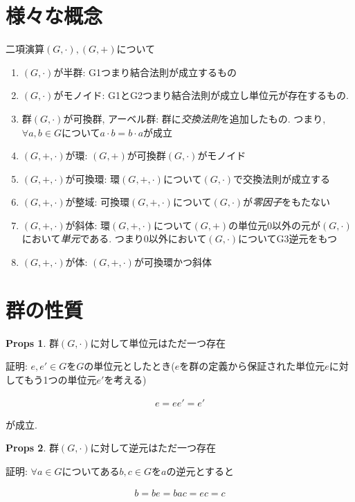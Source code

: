 \documentclass[dvipdfmx]{jsarticle}
\theoremstyle{definition}
\newtheorem{props}{Props}
\numberwithin{equation}{section}
\numberwithin{props}{section}
\numberwithin{definition}{section}
\numberwithin{note}{section}
\begin{document}
\section{様々な概念}
二項演算$(G,\cdot),(G,+)$について
\begin{enumerate}
     \item $(G,\cdot)$が半群: G1つまり結合法則が成立するもの
     \item $(G,\cdot)$がモノイド: G1とG2つまり結合法則が成立し単位元が存在するもの.

     \item 群$(G,\cdot)$が可換群, アーベル群: 群に\emph{交換法則}を追加したもの. つまり, $\forall a,b\in G$について$a\cdot b=b\cdot a$が成立
     \item $(G,+,\cdot)$が環: $(G,+)$が可換群$(G,\cdot)$がモノイド
     \item $(G,+,\cdot)$が可換環: 環$(G,+,\cdot)$について$(G,\cdot)$で交換法則が成立する
     \item $(G,+,\cdot)$が整域: 可換環$(G,+,\cdot)$について$(G,\cdot)$が\emph{零因子}をもたない
     \item $(G,+,\cdot)$が斜体: 環$(G,+,\cdot)$について$(G,+)$の単位元$0$以外の元が$(G,\cdot)$において\emph{単元}である. つまり$0$以外において$(G,\cdot)$についてG3逆元をもつ
     \item $(G,+,\cdot)$が体: $(G,+,\cdot)$が可換環かつ斜体
\end{enumerate}

\section{群の性質}
\begin{props}
     群$(G,\cdot)$に対して単位元はただ一つ存在
\end{props}

証明: $e,e'\in G$を$G$の単位元としたとき($e$を群の定義から保証された単位元$e$に対してもう1つの単位元$e'$を考える)

\begin{align}
     e=ee'=e'
\end{align}

が成立.
\begin{props}
     群$(G,\cdot)$に対して逆元はただ一つ存在
\end{props}


証明: $\forall a\in G$についてある$b,c\in G$を$a$の逆元とすると

\begin{align}
     b=be=bac=ec=c
\end{align}
\end{document}
